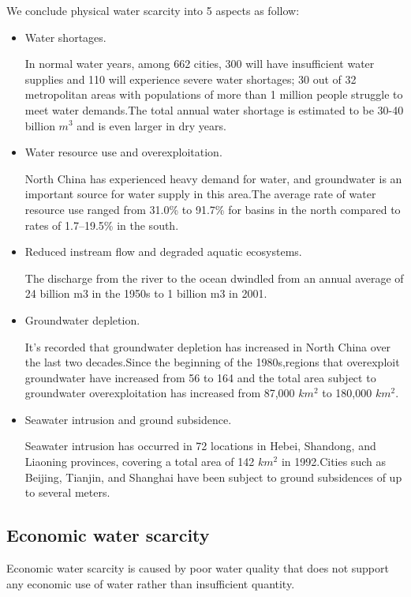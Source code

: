 We conclude physical water scarcity into 5 aspects as follow:
\begin{itemize}
\item Water shortages.

In normal water years, among 662 cities, 300 will have insufficient water supplies and 110 will experience severe water shortages; 30 out of 32 metropolitan areas with populations of more than 1 million people struggle to meet water demands.The total annual water shortage is estimated to be 30-40 billion $m^3$ and is even larger in dry years.

\item Water resource use and overexploitation.

North China has experienced heavy demand for water, and groundwater is an important source for water supply in this area.The average rate of water resource use ranged from 31.0\% to 91.7\% for basins in the north compared to rates of 1.7–19.5\% in the south.

\item Reduced instream flow and degraded aquatic ecosystems.

The discharge from the river to the ocean dwindled from an annual average of 24 billion m3 in the 1950s to 1 billion m3 in 2001.

\item Groundwater depletion.

It's recorded that groundwater depletion has increased in North China over the last two decades.Since the beginning of the 1980s,regions that overexploit groundwater have increased from 56 to 164 and the total area subject to groundwater overexploitation has increased from 87,000 $km^2$ to 180,000 $km^2$.

\item Seawater intrusion and ground subsidence.

Seawater intrusion has occurred in 72 locations in Hebei, Shandong, and Liaoning provinces, covering a total area of 142 $km^2$ in 1992.Cities such as Beijing, Tianjin, and Shanghai have been subject to ground subsidences of up to several meters.
\end{itemize}

\subsection{Economic water scarcity}
Economic water scarcity is caused by poor water quality that does not support any economic use of water rather than insufficient quantity.

